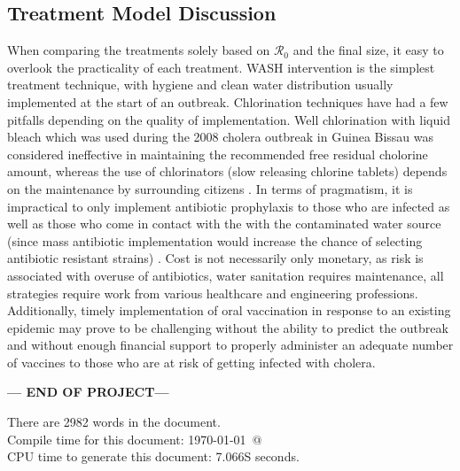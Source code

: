 \documentclass[12pt]{article}\usepackage[]{graphicx}\usepackage[]{color}
\begin{document}

\subsection{Treatment Model Discussion}
When comparing the treatments solely based on $\mathcal R_0$ and the final size, it easy to overlook the practicality of each treatment.
WASH intervention is the simplest treatment technique, with hygiene and clean water distribution usually implemented at the start of an outbreak.
Chlorination techniques have had a few pitfalls depending on the quality of implementation.
Well chlorination with liquid bleach which was used during the 2008 cholera outbreak in Guinea Bissau was considered ineffective in maintaining the recommended free residual cholorine amount, whereas the use of chlorinators (slow releasing chlorine tablets) depends on the maintenance by surrounding citizens \citep{link26}.
In terms of pragmatism, it is impractical to only implement antibiotic prophylaxis to those who are infected as well as those who come in contact with the with the contaminated water source (since mass antibiotic implementation would increase the chance of selecting antibiotic resistant strains) \citep{link23}.
Cost is not necessarily only monetary, as risk is associated with overuse of antibiotics, water sanitation requires maintenance, all strategies require work from various healthcare and engineering professions.
Additionally, timely implementation of oral vaccination in response to an existing epidemic may prove to be challenging without the ability to predict the outbreak and without enough financial support to properly administer an adequate number of vaccines to those who are at risk of getting infected with cholera.

\bigskip\vfill
\centerline{\bf--- END OF PROJECT---}
\bigskip
There are 2982 words in the document.\\
Compile time for this document:
\today\ @ \thistime\\
CPU time to generate this document: 7.066S seconds.
\printbibliography
\end{document}
